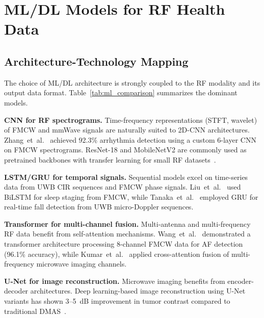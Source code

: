 \documentclass[journal,twoside]{IEEEtran}
\begin{document}
\section{ML/DL Models for RF Health Data}

\subsection{Architecture-Technology Mapping}
The choice of ML/DL architecture is strongly coupled to the RF modality and its output data format. Table~\ref{tab:ml_comparison} summarizes the dominant models.

\textbf{CNN for RF spectrograms.} Time-frequency representations (STFT, wavelet) of FMCW and mmWave signals are naturally suited to 2D-CNN architectures. Zhang~et~al.~\cite{ref_zhang_arrhythmia2024} achieved 92.3\% arrhythmia detection using a custom 6-layer CNN on FMCW spectrograms. ResNet-18 and MobileNetV2 are commonly used as pretrained backbones with transfer learning for small RF datasets~\cite{ref_cnn_rf2024}.

\textbf{LSTM/GRU for temporal signals.} Sequential models excel on time-series data from UWB CIR sequences and FMCW phase signals. Liu~et~al.~\cite{ref_liu_sleep2024} used BiLSTM for sleep staging from FMCW, while Tanaka~et~al.~\cite{ref_tanaka_fall2024} employed GRU for real-time fall detection from UWB micro-Doppler sequences.

\textbf{Transformer for multi-channel fusion.} Multi-antenna and multi-frequency RF data benefit from self-attention mechanisms. Wang~et~al.~\cite{ref_wang_cardiac2025} demonstrated a transformer architecture processing 8-channel FMCW data for AF detection (96.1\% accuracy), while Kumar~et~al.~\cite{ref_kumar_breast2025} applied cross-attention fusion of multi-frequency microwave imaging channels.

\textbf{U-Net for image reconstruction.} Microwave imaging benefits from encoder-decoder architectures. Deep learning-based image reconstruction using U-Net variants has shown 3--5~dB improvement in tumor contrast compared to traditional DMAS~\cite{ref_unet_mwi2024}.
\end{document}
